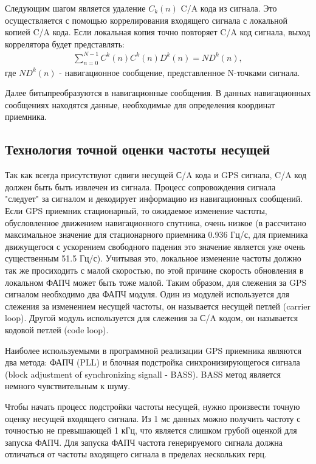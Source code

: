 Следующим шагом является удаление ${C_k(n)}$ C/A кода из сигнала. Это осуществляется с помощью коррелирования 
входящего сигнала с локальной копией C/A кода. Если локальная копия точно повторяет C/A код сигнала, 
выход коррелятора будет представлять:
\begin{eqnarray}
\sum_{n=0}^{N-1} C^k(n) C^k(n) D^k(n) = ND^k(n),
\end{eqnarray}
где ${ND^k(n)}$ - навигационное сообщение, представленное N-точками сигнала.

Далее битыпреобразуются в навигационные сообщения. В данных навигационных сообщениях
находятся данные, необходимые для определения координат приемника.

\subsection{Технология точной оценки частоты несущей}
Так как всегда присутствуют сдвиги несущей С/A кода и GPS сигнала, C/A код должен быть быть извлечен из сигнала. Процесс сопровождения 
сигнала "следует" за сигналом и декодирует информацию из навигационных сообщений. Если GPS приемник стационарный, то ожидаемое
изменение частоты, обусловленное движением навигационного спутника, очень низкое (в \cite{tsui} рассчитано максимальное 
значение для стационарного
приемника 0.936 Гц/с, для приемника движущегося с ускорением свободного падения это значение является уже очень существенным 
51.5 Гц/с).
Учитывая это, локальное изменение частоты должно так же просиходить с малой скоростью, по этой причине скорость обновления в
локальном ФАПЧ может быть тоже малой. Таким образом, для слежения за GPS сигналом необходимо два ФАПЧ модуля. Один из модулей
используется для слежения за изменением несущей частоты, он называется несущей петлей (carrier loop). Другой модуль 
используется для слежения за С/A кодом, он называется кодовой петлей (code loop).

Наиболее используемыми в программной реализации GPS приемника являются два метода: ФАПЧ (PLL) и блочная подстройка синхронизирующегося
сигнала (block adjustment of synchronizing signall - BASS). BASS метод является немного чувствительным к шуму.

Чтобы начать процесс подстройки частоты несущей, нужно произвести точную оценку несущей входящего сигнала.
Из 1 мс данных можно получить частоту с точностью не превышающей 1 кГц, что является слишком грубой оценкой
для запуска ФАПЧ. Для запуска ФАПЧ частота генерируемого сигнала должна отличаться от частоты входящего
сигнала в пределах нескольких герц.

